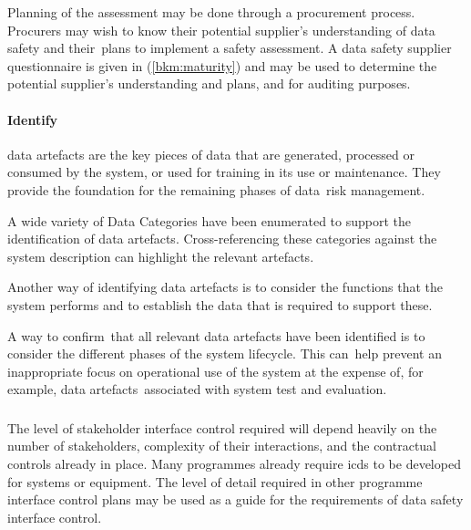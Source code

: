 Planning of the assessment may be done through a procurement process. Procurers may wish to \cbstart know their potential supplier's understanding of data safety and their\cbend\ plans to implement a \gls{safety assessment}. \cbstart A data safety supplier questionnaire is given in (\autoref{bkm:maturity}) and may be used to determine the potential supplier's understanding and plans, and for auditing purposes\cbend.

\paragraph{Identify }
\Glspl{data artefact} are the key pieces of data that are generated, processed or consumed by the system, or used for training in its use or maintenance. They provide the foundation for the remaining phases of \cbstart data\cbend\ risk management.

\cbstart A wide variety of Data Categories have been enumerated to support the identification of \glspl{data artefact}. Cross-referencing these categories against the system description can highlight the relevant artefacts.\cbend\ 

Another way of identifying \glspl{data artefact} \cbstart is to consider the functions that the system performs and to establish the data that is required to support these\cbend.

A \cbstart way to confirm\cbend\ that all relevant \glspl{data artefact} have been identified is to consider the different phases of the system lifecycle. This \cbstart can\cbend\ help prevent an inappropriate focus on operational use of the system at the expense of, for example, \cbstart\glspl{data artefact}\cbend\ associated with system test and evaluation.

\subsubsection{}
The level of
\gls{stakeholder}
interface control required will depend heavily on the number of \glspl{stakeholder}, complexity of their interactions, and the contractual controls already in place. Many programmes already require \glspl{icd} to be developed for systems or equipment. The level of detail required in other programme interface control plans may be used as a guide for the requirements of data safety interface control. 

